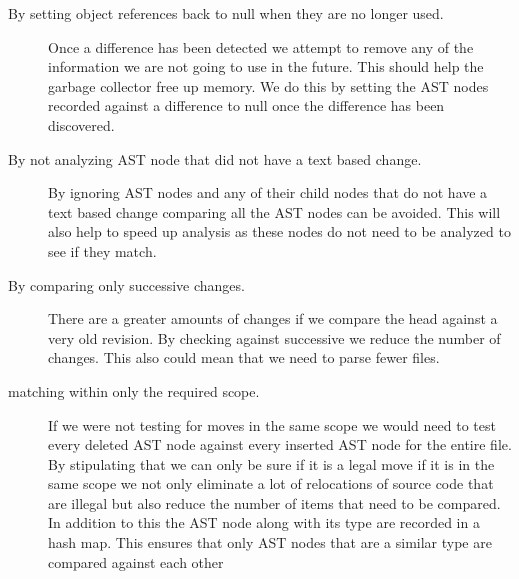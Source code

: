 \begin{description}
 \item [By setting object references back to null when they are no longer used.]
Once a difference has been detected we attempt to remove any of the information we are not going to use in the future.  This should help the garbage collector free up memory. We do this by setting the AST nodes recorded against a difference to null once the difference has been discovered. 
\item [By not analyzing AST node that did not have a text based change.] 
By ignoring AST nodes and any of their child nodes that do not have a text based change comparing all the AST nodes can be avoided.  This will also help to speed up analysis as these nodes do not need to be analyzed to see if they match.
\item [By comparing only successive changes.] 
There are a greater amounts of changes if we compare the head against a very old revision. By checking against successive we reduce the number of changes. This also could mean that we need to parse fewer files.
\item [matching within only the required scope.]
If we were not testing for moves in the same scope we would need to test every deleted AST node against every inserted AST node for the entire file. By stipulating that we can only be sure if it is a legal move if it is in the same scope we not only eliminate a lot of relocations of source code that are illegal but also reduce the number of items that need to be compared. In addition to this the AST node along with its type are recorded in a hash map.  This ensures that only AST nodes that are a similar type are compared against each other

\end{description}



